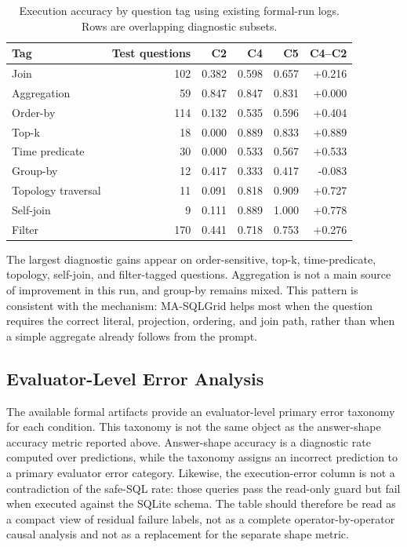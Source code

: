\documentclass{ieeeaccess}
\begin{document}
\begin{table}[t]
\caption{Execution accuracy by question tag using existing formal-run logs. Rows are overlapping diagnostic subsets.}
\centering
\small
\begin{tabular*}{\textwidth}{@{\extracolsep{\fill}}lrrrrr}
\toprule
Tag & Test questions & C2 & C4 & C5 & C4--C2 \\
\midrule
Join & 102 & 0.382 & 0.598 & 0.657 & +0.216 \\
Aggregation & 59 & 0.847 & 0.847 & 0.831 & +0.000 \\
Order-by & 114 & 0.132 & 0.535 & 0.596 & +0.404 \\
Top-k & 18 & 0.000 & 0.889 & 0.833 & +0.889 \\
Time predicate & 30 & 0.000 & 0.533 & 0.567 & +0.533 \\
Group-by & 12 & 0.417 & 0.333 & 0.417 & -0.083 \\
Topology traversal & 11 & 0.091 & 0.818 & 0.909 & +0.727 \\
Self-join & 9 & 0.111 & 0.889 & 1.000 & +0.778 \\
Filter & 170 & 0.441 & 0.718 & 0.753 & +0.276 \\
\bottomrule
\end{tabular*}
\end{table}

The largest diagnostic gains appear on order-sensitive, top-k, time-predicate, topology, self-join, and filter-tagged questions. Aggregation is not a main source of improvement in this run, and group-by remains mixed. This pattern is consistent with the mechanism: MA-SQLGrid helps most when the question requires the correct literal, projection, ordering, and join path, rather than when a simple aggregate already follows from the prompt.

\subsection{Evaluator-Level Error Analysis}\label{evaluator-level-error-analysis}

The available formal artifacts provide an evaluator-level primary error taxonomy for each condition. This taxonomy is not the same object as the answer-shape accuracy metric reported above. Answer-shape accuracy is a diagnostic rate computed over predictions, while the taxonomy assigns an incorrect prediction to a primary evaluator error category. Likewise, the execution-error column is not a contradiction of the safe-SQL rate: those queries pass the read-only guard but fail when executed against the SQLite schema. The table should therefore be read as a compact view of residual failure labels, not as a complete operator-by-operator causal analysis and not as a replacement for the separate shape metric.
\end{document}
